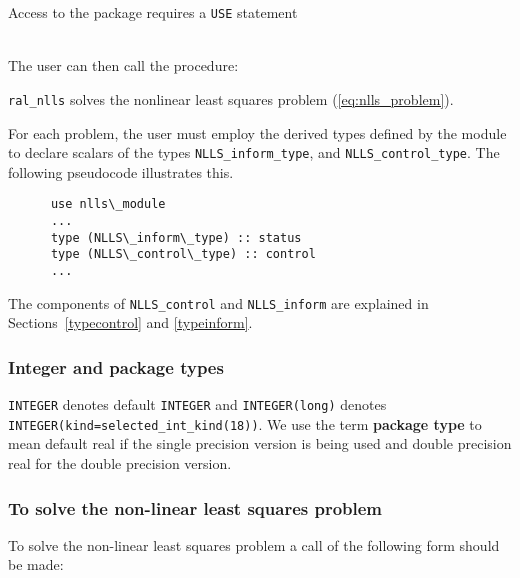 \documentclass{hslspec}
\begin{document}
Access to the package requires a {\tt USE} statement \\ \\
\indent\hspace{5mm}{\tt use nlls\_module} 
\medskip

\noindent The user can then call the procedure:
\vspace{-0.1cm}
\begin{description}
\item {\tt ral\_nlls}  solves the nonlinear least squares problem (\ref{eq:nlls_problem}).
\end{description}


\hsltypes
\label{derived types}
For each problem, the user must employ the derived types defined by the
module to declare scalars of the types {\tt NLLS\_inform\_type}, and
{\tt NLLS\_control\_type}.
The following pseudocode illustrates this.
\begin{verbatim}
      use nlls\_module
      ...
      type (NLLS\_inform\_type) :: status
      type (NLLS\_control\_type) :: control
      ...
\end{verbatim}
The components of {\tt NLLS\_control} and {\tt NLLS\_inform} are explained
in Sections~\ref{typecontrol} and \ref{typeinform}. 


\hslarguments

\subsubsection{Integer and package types}
{\tt INTEGER} denotes default {\tt INTEGER} and 
{\tt INTEGER(long)} denotes {\tt INTEGER(kind=selected\_int\_kind(18))}.
We use the term {\bf package type} to mean
default real if the single precision version is being used and
double precision real for the double precision version.

\subsubsection{To solve the non-linear least squares problem}
\label{sec:factorize}

To solve the non-linear least squares problem a call of the following form should be made:
\end{document}
